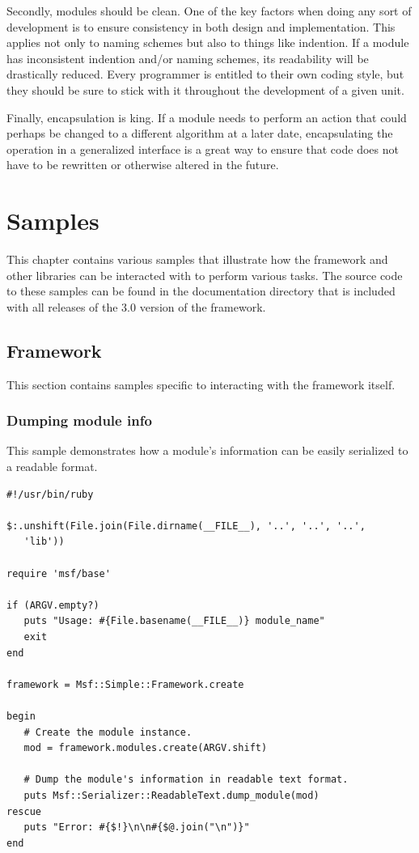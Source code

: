 \documentclass{report}
\begin{document}
\par
Secondly, modules should be clean.  One of the key factors when
doing any sort of development is to ensure consistency in both
design and implementation.  This applies not only to naming schemes
but also to things like indention.  If a module has inconsistent
indention and/or naming schemes, its readability will be drastically
reduced.  Every programmer is entitled to their own coding style,
but they should be sure to stick with it throughout the development
of a given unit.

\par
Finally, encapsulation is king.  If a module needs to perform an
action that could perhaps be changed to a different algorithm at a
later date, encapsulating the operation in a generalized interface
is a great way to ensure that code does not have to be rewritten or
otherwise altered in the future.

\appendix
\chapter{Samples}

\par
This chapter contains various samples that illustrate how the
framework and other libraries can be interacted with to perform
various tasks.  The source code to these samples can be found in the
documentation directory that is included with all releases of the
3.0 version of the framework.

    \section{Framework}

\par
This section contains samples specific to interacting with the
framework itself.

        \subsection{Dumping module info}

\par
This sample demonstrates how a module's information can be easily
serialized to a readable format.

\footnotesize{
\begin{verbatim}
#!/usr/bin/ruby

$:.unshift(File.join(File.dirname(__FILE__), '..', '..', '..',
   'lib'))

require 'msf/base'

if (ARGV.empty?)
   puts "Usage: #{File.basename(__FILE__)} module_name"
   exit
end

framework = Msf::Simple::Framework.create

begin
   # Create the module instance.
   mod = framework.modules.create(ARGV.shift)

   # Dump the module's information in readable text format.
   puts Msf::Serializer::ReadableText.dump_module(mod)
rescue
   puts "Error: #{$!}\n\n#{$@.join("\n")}"
end
\end{verbatim}}
\end{document}

